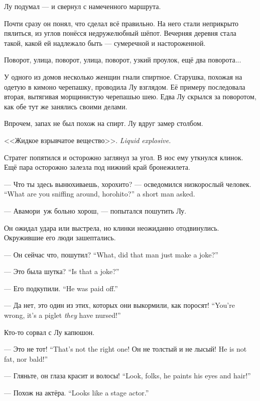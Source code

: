Лу подумал --- и свернул с намеченного маршрута.

Почти сразу он понял, что сделал всё правильно.
На него стали неприкрыто пялиться, из углов понёсся недружелюбный шёпот.
Вечерняя деревня стала такой, какой ей надлежало быть --- сумеречной и настороженной.

Поворот, улица, поворот, улица, поворот, узкий проулок, ещё два поворота...

У одного из домов несколько женщин гнали спиртное.
Старушка, похожая на одетую в кимоно черепашку, проводила Лу взглядом.
Её примеру последовала вторая, вытягивая морщинистую черепашью шею.
Едва Лу скрылся за поворотом, как обе тут же занялись своими делами.

Впрочем, запах не был похож на спирт.
Лу вдруг замер столбом.

{<<Жидкое взрывчатое вещество>>.}
{\emph{Liquid explosive.}}

Стратег попятился и осторожно заглянул за угол.
В нос ему уткнулся клинок.
Ещё пара осторожно залезла под нижний край бронежилета.

{--- Что ты здесь вынюхиваешь, хорохито? --- осведомился низкорослый человек.}
{``What are you sniffing around, horohito?'' a short man asked.}

--- Авамори\FM\ уж больно хорош, --- попытался пошутить Лу.

Он ожидал удара или выстрела, но клинки неожиданно отодвинулись.
Окружившие его люди зашептались.

{--- Он сейчас что, пошутил?}
{``What, did that man just make a joke?''}

{--- Это была шутка?}
{``Is that a joke?''}

{--- Его подкупили.}
{``He was paid off.''}

{--- Да нет, это один из этих, которых они выкормили, как поросят!}
{``You're wrong, it's a piglet \emph{they} have nursed!''}

Кто-то сорвал с Лу капюшон.

{--- Это не тот!}
{``That's not the right one!}
{Он не толстый и не лысый!}
{He is not fat, nor bald!''}

{--- Гляньте, он глаза красит и волосы!}
{``Look, folks, he paints his eyes and hair!''}

{--- Похож на актёра.}
{``Looks like a stage actor.''}

